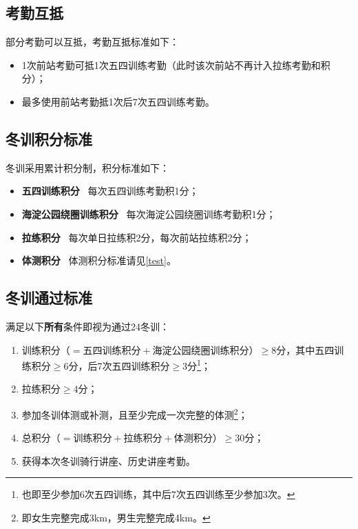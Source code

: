 \documentclass[UTF8]{ctexart}
\begin{document}
\subsection{考勤互抵}

部分考勤可以互抵，考勤互抵标准如下：

\begin{itemize}[nosep,left=4em]
    \item 1次前站考勤可抵1次五四训练考勤（此时该次前站不再计入拉练考勤和积分）；
    \item 最多使用前站考勤抵1次后7次五四训练考勤。 
\end{itemize}

\subsection{冬训积分标准}
冬训采用累计积分制，积分标准如下：

\begin{itemize}[nosep,left=4em]
    \item \textbf{五四训练积分} \ 每次五四训练考勤积1分；
    \item \textbf{海淀公园绕圈训练积分} \ 每次海淀公园绕圈训练考勤积1分；
    \item \textbf{拉练积分} \  每次单日拉练积2分，每次前站拉练积2分；
    \item \textbf{体测积分} \  体测积分标准请见\ref{test}。 
\end{itemize}

\subsection{冬训通过标准}

满足以下\textbf{所有}条件即视为通过24冬训：
\begin{enumerate}[nosep,left=4em]
    \item 训练积分（$=\text{五四训练积分}+\text{海淀公园绕圈训练积分}$）$\ge 8$分，其中五四训练积分$\ge 6$分，后7次五四训练积分$\ge 3$分\footnote{也即至少参加6次五四训练，其中后7次五四训练至少参加3次。}；
    \item 拉练积分$\ge 4$分；
    \item 参加冬训体测或补测，且至少完成一次完整的体测\footnote{即女生完整完成3km，男生完整完成4km。}；
    \item 总积分（$=\text{训练积分}+\text{拉练积分}+\text{体测积分}$）$\ge 30$分；
    \item 获得本次冬训骑行讲座、历史讲座考勤。
\end{enumerate}
\end{document}
